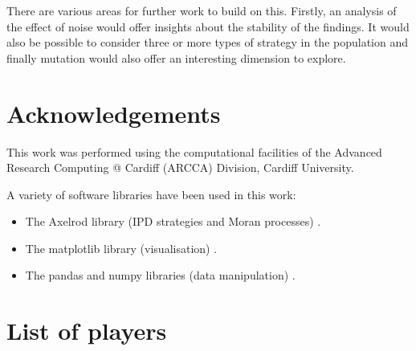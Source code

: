 \documentclass{article}
\begin{document}
There are various areas for further work to build on this. Firstly, an analysis
of the effect of noise would offer insights about the stability of the findings.
It would also be possible to consider three or more types of strategy in the
population and finally mutation would also offer an interesting dimension to
explore.

\section*{Acknowledgements}

This work was performed using the computational facilities of the Advanced
Research Computing @ Cardiff (ARCCA) Division, Cardiff University.

A variety of software libraries have been used in this work:

\begin{itemize}
    \item The Axelrod library (IPD strategies and Moran processes)
        \cite{axelrodproject}.
    \item The matplotlib library (visualisation) \cite{hunter2007matplotlib}.
    \item The pandas and numpy libraries (data manipulation)
        \cite{mckinney2010data, walt2011numpy}.
\end{itemize}

\printbibliography

\appendix

\section{List of players}\label{app:list_of_players}

\begin{multicols}{3}
	\begin{enumerate}
		
	\end{enumerate}
\end{multicols}
\end{document}
